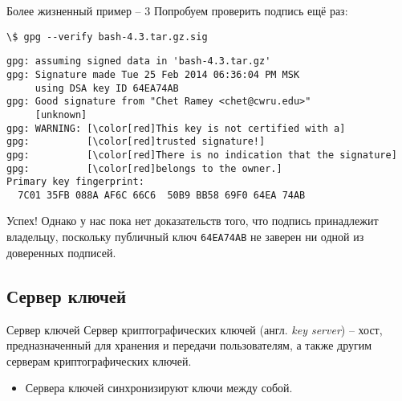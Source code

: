 \documentclass[presentation]{beamer}
\begin{document}
\begin{frame}[fragile]{Более жизненный пример -- 3}
  Попробуем проверить подпись ещё раз:
  \begin{Verbatim}[commandchars=\\\[\]]
\$ gpg --verify bash-4.3.tar.gz.sig
  \end{Verbatim}
  \footnotesize
  \begin{Verbatim}[commandchars=\\\[\]]
gpg: assuming signed data in 'bash-4.3.tar.gz'
gpg: Signature made Tue 25 Feb 2014 06:36:04 PM MSK
     using DSA key ID 64EA74AB
gpg: Good signature from "Chet Ramey <chet@cwru.edu>"
     [unknown]
gpg: WARNING: [\color[red]This key is not certified with a]
gpg:          [\color[red]trusted signature!]
gpg:          [\color[red]There is no indication that the signature]
gpg:          [\color[red]belongs to the owner.]
Primary key fingerprint:
  7C01 35FB 088A AF6C 66C6  50B9 BB58 69F0 64EA 74AB
  \end{Verbatim}
  \normalsize

  \vspace{5 mm}

  Успех!  Однако у нас пока нет доказательств того, что подпись
  принадлежит владельцу, поскольку публичный ключ \texttt{64EA74AB} не
  заверен ни одной из доверенных подписей.
\end{frame}



\subsection{Сервер ключей}

\begin{frame}[fragile]{Сервер ключей}
  \raisebox{-.30em}{\Large\HandRight}\hspace{.25em} Сервер
  криптографических ключей (англ. \emph{key server}) -- хост,
  предназначенный для хранения и передачи пользователям, а также
  другим серверам криптографических ключей.

  \begin{itemize}
  \item Сервера ключей синхронизируют ключи между собой.
  \end{itemize}
\end{frame}
\end{document}
